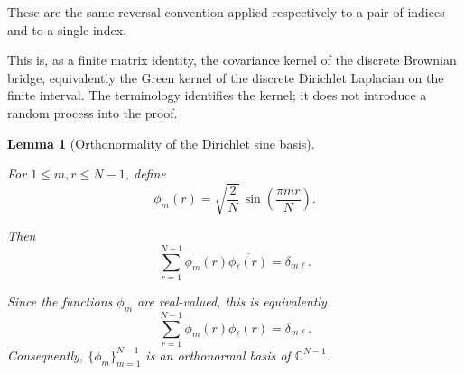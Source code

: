 \documentclass[11pt]{amsart}
\numberwithin{equation}{section}
\theoremstyle{plain}
\newtheorem{lemma}[theorem]{Lemma}
\theoremstyle{definition}
\theoremstyle{remark}
\begin{document}
These are the same reversal convention applied respectively to a pair
of indices and to a single index.

This is, as a finite matrix identity, the covariance kernel of the
discrete Brownian bridge, equivalently the Green kernel of the discrete
Dirichlet Laplacian on the finite interval. The terminology identifies
the kernel; it does not introduce a random process into the proof.


\begin{lemma}[Orthonormality of the Dirichlet sine basis]
\label{lem:dirichlet_sine_orthonormality}

For \(1\le m,r\le N-1\), define
\begin{equation}
\phi_m(r)
=
\sqrt{\frac{2}{N}}\,
\sin\left(\frac{\pi m r}{N}\right).
\label{eq:dirichlet_sine_modes}
\end{equation}

Then
\begin{equation}
\sum_{r=1}^{N-1}
\phi_m(r)\overline{\phi_\ell(r)}
=
\delta_{m\ell}.
\label{eq:dirichlet_sine_orthonormality}
\end{equation}

Since the functions \(\phi_m\) are real-valued, this is equivalently
\[
\sum_{r=1}^{N-1}
\phi_m(r)\phi_\ell(r)
=
\delta_{m\ell}.
\]
Consequently, \(\{\phi_m\}_{m=1}^{N-1}\) is an orthonormal basis of
\(\mathbb C^{N-1}\).

\end{lemma}
\end{document}
